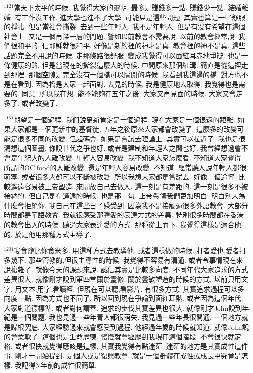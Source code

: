 \documentclass{book}
\begin{document}
$^{1121}$當天下太平的時候.
我覺得大家的靈明.
最多是賺錢多一點.
賺錢少一點.
結婚離婚.
有工作沒工作.
進大學也進不了大學.
可能只是這些問題.
其實也算是一些舒服的掙扎.
但是當社會撕裂.
去到一些年輕人.
我不是年輕人.
但是有沒有希望在這個社會上.
又是一個再深一層的問題.
譬如以前教會不需要說.
以前的教會經常說.
我們很和平的.
信耶穌就很和平.
好像是新約裡的神才是真.
教會裡的神不是真.
這些話題完全不用說的時候.
走那條路很舒服.
變成我覺得可以面紅耳赤地爭辯.
也是一條健康的路.
但是當現在的撕裂這麼大的時候.
中間原來那個紅溝.
簡直是從這裡走到那裡.
那個空隙是完全沒有一個橋可以隔開的時候.
我看到我這邊的橋.
對方也不是在看到.
因為橋是大家一起面對.
去見的時候.
我是健康地去取得.
我覺得也是需要的.
同意.
所以我在想.
能不能夠在五年之後.
大家又再見面的時候.
大家又會走多了.
或者改變了.

$^{1161}$期望是一個過程.
我們說更新肯定是一個過程.
現在大家是一個很遠的距離.
如果大家都是一個更新中的基督徒.
五年之後原來大家都會改變了.
這麼多的改變可能是很多不同的改變.
但起碼會.
如果是嘗試去理論上.
其實可以拉近了.
我也是很渴想這個圖畫.
你說世代之爭也好.
或者是建制和年輕人之間也好.
我曾經想過會不會是年紀大的人難改變.
年輕人容易改變.
我不知道大家怎麼看.
不知道大家覺得.
所謂的OC food的人難改變.
還是年輕人容易改變.
不知道.
經常聽人說年輕人都很萌塞.
或者很多人都可以不斷被改變.
所以我想大家都是嘗試去.
好像一個途徑.
比較遙遠容易被上帝塑造.
來開放自己去做人.
這一刻是有差距的.
這一刻是很多不被接納的.
但自己是在遙遠的時候.
也是那一句.
上帝帶領我們更加明白.
明白別人為什麼會拒絕你.
我自己在這些日子感受到.
因為我不是接觸過很多外語教會.
大部分時間都是華語教會.
我就很感受那種愛的表達方式的差異.
特別很多時間都在香港的教會出入的時候.
聽過大家表達愛的方式.
那種從上而下.
我覺得這樣是適合他的.
於是他用那種方式主導了.

$^{1201}$我食鹽比你食米多.
用這種方式去教導他.
或者這樣做的時候.
打者愛也,愛者打多幾下.
那些管教的,但很主導性的時候.
我覺得不容易有溝通.
或者令事情現在來說複雜了.
就像今天的課題來說.
誠信其實是比較多向度.
不同年代大家追求的方式差異很大.
就像剛才說到第四堂關於靈修.
關於靈敏塑造的時候的方式.
以前只用文字.
用文本,用字,看讀經.
但現在可以聽,看影片.
有很多方式.
其實追求過程可以多向度一點.
因為方式也不同了.
所以回到現在爭論到面紅耳熱.
或者因為這個年代.
大家對道德標準.
或者對何謂善.
追求的步伐其實差異也很大.
就像剛才John說到年紀是一個問題.
我也見過一些年青人都很萌失.
我見過一些年長很開通.
一個地方就是歸根究底.
大家經驗過來就會感受到過程.
他經過年歲的時候就知道.
就像John說的會柔軟了.
這個也是生命歷練.
慢慢就會經歷到我現在這個階段.
不會很快就定格.
或者很快就覺得應該是這樣.
其實我覺得有點迷茫.
迷茫的地方是其實成性這件事.
剛才一開始提到.
是個人或是復興教會.
就是一個群體在成性或成長中究竟是怎樣.
我記得N年前的成性很簡單.
\end{document}
